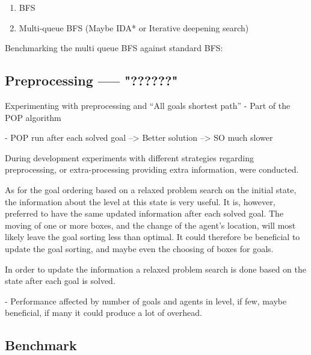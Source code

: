 \documentclass[Main]{subfiles}
\begin{document}





\begin{enumerate}
    \item BFS 
    \item Multi-queue BFS (Maybe IDA* or Iterative deepening search)
\end{enumerate}



Benchmarking the multi queue BFS against standard BFS:





\subsection{Preprocessing ----- "??????" }

Experimenting with preprocessing and ``All goals shortest path'' 
- Part of the POP algorithm

- POP run after each solved goal 
--> Better solution --> SO much slower


During development experiments with different strategies regarding preprocessing, or extra-processing providing extra information, were conducted. 

As for the goal ordering based on a relaxed problem search on the initial state, the information about the level at this state is very useful. It is, however, preferred to have the same updated information after each solved goal. The moving of one or more boxes, and the change of the agent's location, will most likely leave the goal sorting less than optimal. It could therefore be beneficial to update the goal sorting, and maybe even the choosing of boxes for goals. 

In order to update the information a relaxed problem search is done based on the state after each goal is solved. 


- Performance affected by number of goals and agents in level, if few, maybe beneficial, if many it could produce a lot of overhead.





\subsection{Benchmark}
\end{document}
